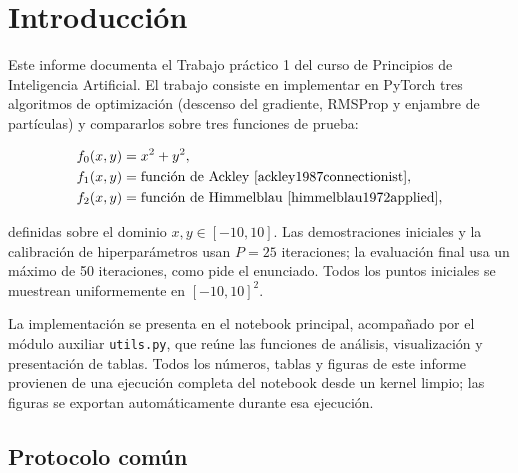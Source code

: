\section{Introducción}

Este informe documenta el Trabajo práctico 1 del curso de Principios de
Inteligencia Artificial. El trabajo consiste en
implementar en PyTorch \cite{paszke2019pytorch} tres algoritmos de
optimización (descenso del gradiente, RMSProp y enjambre de partículas) y
compararlos sobre tres funciones de prueba:

\begin{align*}
f_0(x,y) &= x^2+y^2, \\
f_1(x,y) &= \text{función de Ackley \cite{ackley1987connectionist}}, \\
f_2(x,y) &= \text{función de Himmelblau \cite{himmelblau1972applied}},
\end{align*}

definidas sobre el dominio $x,y\in[-10,10]$. Las demostraciones iniciales y
la calibración de hiperparámetros usan $P=25$ iteraciones; la evaluación
final usa un máximo de 50 iteraciones, como pide el enunciado. Todos los
puntos iniciales se muestrean uniformemente en $[-10,10]^2$.

La implementación se presenta en el notebook principal, acompañado por el
módulo auxiliar \texttt{utils.py}, que reúne las funciones de análisis,
visualización y presentación de tablas. Todos los números, tablas y figuras
de este informe provienen de una ejecución completa del notebook desde un
kernel limpio; las figuras se exportan automáticamente durante esa ejecución.

\subsection{Protocolo común}

